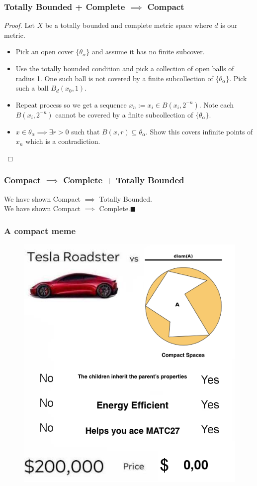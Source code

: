 \documentclass[compress, red]{beamer}
\begin{document}
    \begin{frame}
        \frametitle{Totally Bounded + Complete $\implies$ Compact}
        \begin{proof}
            Let $X$ be a totally bounded and complete metric space where $d$ is our metric.
            \begin{itemize}
                \item<2-> Pick an open cover $\{\theta_{\alpha}\}$ and assume it has no finite subcover.
                \item<3-> Use the totally bounded condition and pick a collection of open balls of radius 1. One such ball is not covered by a
                    finite subcollection of $\{\theta_{\alpha}\}$. Pick such a ball $B_d(x_0,1)$.
                \item<4-> Repeat process so we get a sequence $x_n := x_i \in B(x_i,2^{-n})$. Note each $B(x_i,2^{-n})$ cannot be covered by
                    a finite subcollection of $\{\theta_{\alpha}\}$.
                \item<5-> $x\in\theta_{\alpha} \implies \exists r>0$ such that $B(x,r)\subseteq\theta_{\alpha}$. Show this covers infinite points
                    of $x_n$ which is a contradiction.
            \end{itemize}
        \end{proof}
    \end{frame}

    \begin{frame}
        \frametitle{Compact $\implies$ Complete + Totally Bounded}
        We have shown Compact $\implies$ Totally Bounded.\\
        We have shown Compact $\implies$ Complete.$\blacksquare$
    \end{frame}

    \begin{frame}
        \frametitle{A compact meme}
        \begin{figure}
            \includegraphics[scale=0.25]{meme}
        \end{figure}
    \end{frame}
\end{document}
